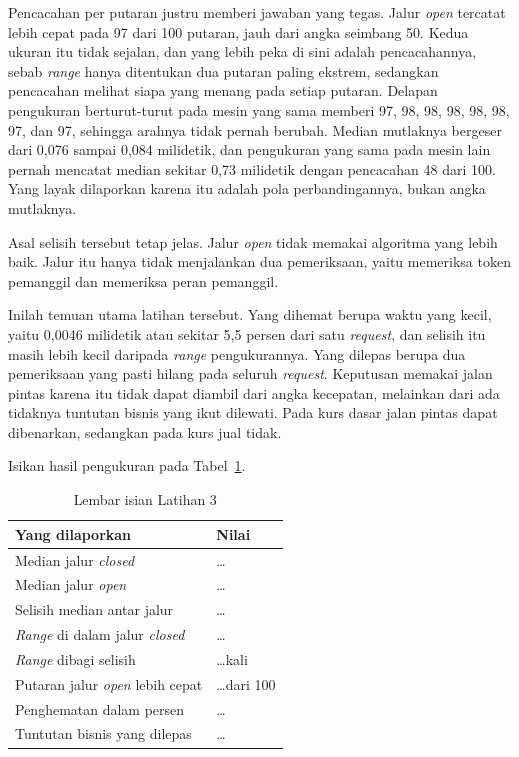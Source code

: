 Pencacahan per putaran justru memberi jawaban yang tegas. Jalur \textit{open}
tercatat lebih cepat pada 97 dari 100 putaran, jauh dari angka seimbang 50.
Kedua ukuran itu tidak sejalan, dan yang lebih peka di sini adalah
pencacahannya, sebab \textit{range} hanya ditentukan dua putaran paling ekstrem,
sedangkan pencacahan melihat siapa yang menang pada setiap putaran. Delapan
pengukuran berturut-turut pada mesin yang sama memberi 97, 98, 98, 98, 98, 98,
97, dan 97, sehingga arahnya tidak pernah berubah. Median mutlaknya bergeser
dari 0,076 sampai 0,084 milidetik, dan pengukuran yang sama pada mesin lain
pernah mencatat median sekitar 0,73 milidetik dengan pencacahan 48 dari 100.
Yang layak dilaporkan karena itu adalah pola perbandingannya, bukan angka
mutlaknya.

Asal selisih tersebut tetap jelas. Jalur \textit{open} tidak memakai algoritma yang
lebih baik. Jalur itu hanya tidak menjalankan dua pemeriksaan, yaitu memeriksa
token pemanggil dan memeriksa peran pemanggil.

Inilah temuan utama latihan tersebut. Yang dihemat berupa waktu yang kecil,
yaitu 0,0046 milidetik atau sekitar 5,5 persen dari satu \textit{request}, dan
selisih itu masih lebih kecil daripada \textit{range} pengukurannya. Yang dilepas berupa dua pemeriksaan yang pasti
hilang pada seluruh \textit{request}. Keputusan memakai jalan pintas karena itu tidak
dapat diambil dari angka kecepatan, melainkan dari ada tidaknya tuntutan bisnis
yang ikut dilewati. Pada kurs dasar jalan pintas dapat dibenarkan,
sedangkan pada kurs jual tidak.

Isikan hasil pengukuran pada Tabel~\ref{tab:lat3-hasil}.

\begin{table}[htbp]
  \centering
  \caption{Lembar isian Latihan 3}
  \label{tab:lat3-hasil}
  \begin{tabularx}{\textwidth}{|X|l|}
    \hline
    \textbf{Yang dilaporkan} & \textbf{Nilai} \\
    \hline
    Median jalur \textit{closed} & \dots \\
    \hline
    Median jalur \textit{open} & \dots \\
    \hline
    Selisih median antar jalur & \dots \\
    \hline
    \textit{Range} di dalam jalur \textit{closed} & \dots \\
    \hline
    \textit{Range} dibagi selisih & \dots kali \\
    \hline
    Putaran jalur \textit{open} lebih cepat & \dots dari 100 \\
    \hline
    Penghematan dalam persen & \dots \\
    \hline
    Tuntutan bisnis yang dilepas & \dots \\
    \hline
  \end{tabularx}
\end{table}

